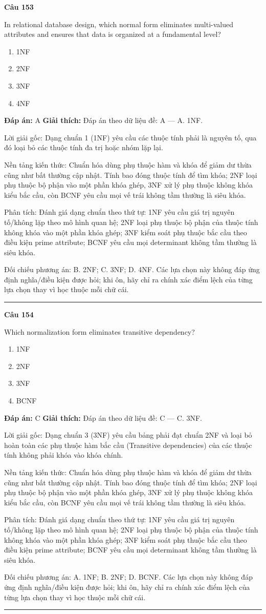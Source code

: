 \documentclass[11pt,a4paper]{article}
\newenvironment{question}[1]{%
  \par\vspace{1em}\noindent\textbf{\large Câu #1}\par\vspace{0.4em}
}{%
  \par\vspace{1em}\hrule\vspace{0.6em}
}
\newenvironment{choices}{%
  \begin{enumerate}[label=\textbf{\Alph*.},leftmargin=2.2em,itemsep=2pt,topsep=3pt]
}{%
  \end{enumerate}
}
\newcommand{\choice}{\item}
\begin{document}
\begin{question}{153}
In relational database design, which normal form eliminates multi-valued attributes and ensures that data is organized at a fundamental level?
\begin{choices}
\choice 1NF
\choice 2NF
\choice 3NF
\choice 4NF
\end{choices}
\textbf{Đáp án:} A
\textbf{Giải thích:} Đáp án theo dữ liệu đề: A — A. 1NF.

Lời giải gốc: Dạng chuẩn 1 (1NF) yêu cầu các thuộc tính phải là nguyên tố, qua đó loại bỏ các thuộc tính đa trị hoặc nhóm lặp lại.

Nền tảng kiến thức: Chuẩn hóa dùng phụ thuộc hàm và khóa để giảm dư thừa cũng như bất thường cập nhật. Tính bao đóng thuộc tính để tìm khóa; 2NF loại phụ thuộc bộ phận vào một phần khóa ghép, 3NF xử lý phụ thuộc không khóa kiểu bắc cầu, còn BCNF yêu cầu mọi vế trái không tầm thường là siêu khóa.

Phân tích: Đánh giá dạng chuẩn theo thứ tự: 1NF yêu cầu giá trị nguyên tố/không lặp theo mô hình quan hệ; 2NF loại phụ thuộc bộ phận của thuộc tính không khóa vào một phần khóa ghép; 3NF kiểm soát phụ thuộc bắc cầu theo điều kiện prime attribute; BCNF yêu cầu mọi determinant không tầm thường là siêu khóa.

Đối chiếu phương án: B. 2NF; C. 3NF; D. 4NF. Các lựa chọn này không đáp ứng định nghĩa/điều kiện được hỏi; khi ôn, hãy chỉ ra chính xác điểm lệch của từng lựa chọn thay vì học thuộc mỗi chữ cái.
\end{question}

\begin{question}{154}
Which normalization form eliminates transitive dependency?
\begin{choices}
\choice 1NF
\choice 2NF
\choice 3NF
\choice BCNF
\end{choices}
\textbf{Đáp án:} C
\textbf{Giải thích:} Đáp án theo dữ liệu đề: C — C. 3NF.

Lời giải gốc: Dạng chuẩn 3 (3NF) yêu cầu bảng phải đạt chuẩn 2NF và loại bỏ hoàn toàn các phụ thuộc hàm bắc cầu (Transitive dependencies) của các thuộc tính không phải khóa vào khóa chính.

Nền tảng kiến thức: Chuẩn hóa dùng phụ thuộc hàm và khóa để giảm dư thừa cũng như bất thường cập nhật. Tính bao đóng thuộc tính để tìm khóa; 2NF loại phụ thuộc bộ phận vào một phần khóa ghép, 3NF xử lý phụ thuộc không khóa kiểu bắc cầu, còn BCNF yêu cầu mọi vế trái không tầm thường là siêu khóa.

Phân tích: Đánh giá dạng chuẩn theo thứ tự: 1NF yêu cầu giá trị nguyên tố/không lặp theo mô hình quan hệ; 2NF loại phụ thuộc bộ phận của thuộc tính không khóa vào một phần khóa ghép; 3NF kiểm soát phụ thuộc bắc cầu theo điều kiện prime attribute; BCNF yêu cầu mọi determinant không tầm thường là siêu khóa.

Đối chiếu phương án: A. 1NF; B. 2NF; D. BCNF. Các lựa chọn này không đáp ứng định nghĩa/điều kiện được hỏi; khi ôn, hãy chỉ ra chính xác điểm lệch của từng lựa chọn thay vì học thuộc mỗi chữ cái.
\end{question}
\end{document}
